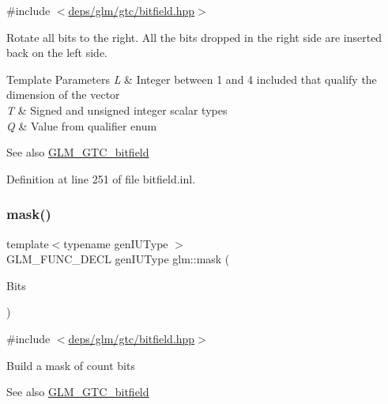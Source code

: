 {\ttfamily \#include $<$\hyperlink{bitfield_8hpp}{deps/glm/gtc/bitfield.\+hpp}$>$}

Rotate all bits to the right. All the bits dropped in the right side are inserted back on the left side.


\begin{DoxyTemplParams}{Template Parameters}
{\em L} & Integer between 1 and 4 included that qualify the dimension of the vector \\
\hline
{\em T} & Signed and unsigned integer scalar types \\
\hline
{\em Q} & Value from qualifier enum\\
\hline
\end{DoxyTemplParams}
\begin{DoxySeeAlso}{See also}
\hyperlink{group__gtc__bitfield}{G\+L\+M\+\_\+\+G\+T\+C\+\_\+bitfield} 
\end{DoxySeeAlso}


Definition at line 251 of file bitfield.\+inl.

\mbox{\label{group__gtc__bitfield_gad7eba518a0b71662114571ee76939f8a}} 
\subsubsection{\texorpdfstring{mask()}{mask()}\hspace{0.1cm}{\footnotesize\ttfamily [1/2]}}
{\footnotesize\ttfamily template$<$typename gen\+I\+U\+Type $>$ \\
G\+L\+M\+\_\+\+F\+U\+N\+C\+\_\+\+D\+E\+CL gen\+I\+U\+Type glm\+::mask (\begin{DoxyParamCaption}\item[{gen\+I\+U\+Type}]{Bits }\end{DoxyParamCaption})}



{\ttfamily \#include $<$\hyperlink{bitfield_8hpp}{deps/glm/gtc/bitfield.\+hpp}$>$}

Build a mask of \textquotesingle{}count\textquotesingle{} bits

\begin{DoxySeeAlso}{See also}
\hyperlink{group__gtc__bitfield}{G\+L\+M\+\_\+\+G\+T\+C\+\_\+bitfield} 
\end{DoxySeeAlso}


